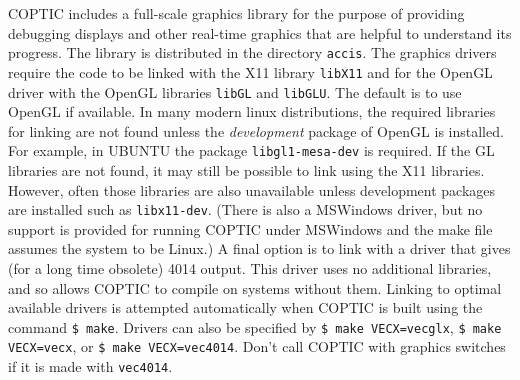 \documentclass[12pt]{article}
\begin{document}
COPTIC includes a full-scale graphics library for the purpose of
providing debugging displays and other real-time graphics that are
helpful to understand its progress. The library is distributed in the
directory \verb!accis!. The graphics drivers require the code to be
linked with the X11 library \verb!libX11! and for the OpenGL driver
with the OpenGL libraries \verb!libGL! and \verb!libGLU!. The default
is to use OpenGL if available. In many modern linux distributions, the
required libraries for linking are not found unless the
\emph{development} package of OpenGL is installed. For example, in
UBUNTU the package \verb!libgl1-mesa-dev!  is required. If the GL
libraries are not found, it may still be possible to link using the
X11 libraries. However, often those libraries are also unavailable
unless development packages are installed such as
\verb!libx11-dev!. (There is also a MSWindows driver, but no support is
provided for running COPTIC under MSWindows and the make file assumes
the system to be Linux.) A final option is to link with a driver that
gives (for a long time obsolete) 4014 output. This driver uses no additional
libraries, and so allows COPTIC to compile on systems without
them. Linking to optimal available drivers is attempted automatically
when COPTIC is built using the command \verb!$ make!.  Drivers can
also be specified by \verb!$ make VECX=vecglx!, \verb!$ make VECX=vecx!, or
\verb!$ make VECX=vec4014!. Don't call COPTIC with graphics switches
if it is made with \verb!vec4014!.
\end{document}
